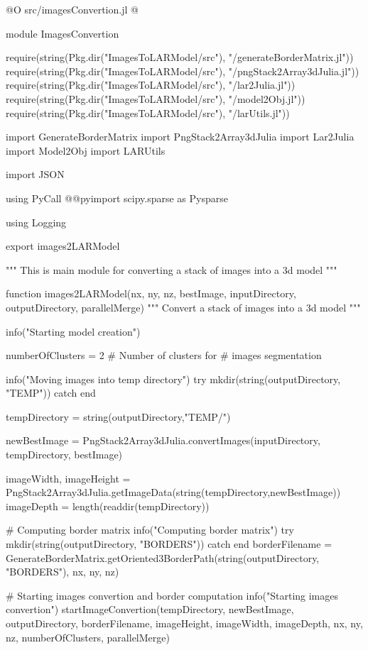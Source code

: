 \documentclass[11pt,oneside]{article}	%
\begin{document}
@O src/imagesConvertion.jl
@{module ImagesConvertion

require(string(Pkg.dir("ImagesToLARModel/src"), "/generateBorderMatrix.jl"))
require(string(Pkg.dir("ImagesToLARModel/src"), "/pngStack2Array3dJulia.jl"))
require(string(Pkg.dir("ImagesToLARModel/src"), "/lar2Julia.jl"))
require(string(Pkg.dir("ImagesToLARModel/src"), "/model2Obj.jl"))
require(string(Pkg.dir("ImagesToLARModel/src"), "/larUtils.jl"))

import GenerateBorderMatrix
import PngStack2Array3dJulia
import Lar2Julia
import Model2Obj
import LARUtils

import JSON

using PyCall
@@pyimport scipy.sparse as Pysparse

using Logging

export images2LARModel

"""
This is main module for converting a stack
of images into a 3d model
"""

function images2LARModel(nx, ny, nz, bestImage, inputDirectory, outputDirectory, parallelMerge)
  """
  Convert a stack of images into a 3d model
  """

  info("Starting model creation")

  numberOfClusters = 2 # Number of clusters for
                       # images segmentation

  info("Moving images into temp directory")
  try
    mkdir(string(outputDirectory, "TEMP"))
  catch
  end

  tempDirectory = string(outputDirectory,"TEMP/")

  newBestImage = PngStack2Array3dJulia.convertImages(inputDirectory, tempDirectory, bestImage)

  imageWidth, imageHeight = PngStack2Array3dJulia.getImageData(string(tempDirectory,newBestImage))
  imageDepth = length(readdir(tempDirectory))

  # Computing border matrix
  info("Computing border matrix")
  try
    mkdir(string(outputDirectory, "BORDERS"))
  catch
  end
  borderFilename = GenerateBorderMatrix.getOriented3BorderPath(string(outputDirectory, "BORDERS"), nx, ny, nz)

  # Starting images convertion and border computation
  info("Starting images convertion")
  startImageConvertion(tempDirectory, newBestImage, outputDirectory, borderFilename,
                       imageHeight, imageWidth, imageDepth,
                       nx, ny, nz,
                       numberOfClusters, parallelMerge)

}
\end{document}

